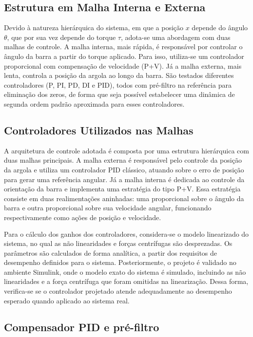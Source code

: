 \documentclass[a4paper, 12pt]{article}
\begin{document}
\subsection{Estrutura em Malha Interna e Externa}
Devido à natureza hierárquica do sistema, em que a posição \( x \) depende do ângulo \( \theta \), que por sua vez depende do torque \( \tau \), adota-se uma abordagem com duas malhas de controle. A malha interna, mais rápida, é responsável por controlar o ângulo da barra a partir do torque aplicado. Para isso, utiliza-se um controlador proporcional com compensação de velocidade (P+V). Já a malha externa, mais lenta, controla a posição da argola ao longo da barra. São testados diferentes controladores (P, PI, PD, DI e PID), todos com pré-filtro na referência para eliminação dos zeros, de forma que seja possível estabelecer uma dinâmica de segunda ordem padrão aproximada para esses controladores.

\subsection{Controladores Utilizados nas Malhas}

A arquitetura de controle adotada é composta por uma estrutura hierárquica com duas malhas principais. A malha externa é responsável pelo controle da posição da argola e utiliza um controlador PID clássico, atuando sobre o erro de posição para gerar uma referência angular. Já a malha interna é dedicada ao controle da orientação da barra e implementa uma estratégia do tipo P+V. Essa estratégia consiste em duas realimentações aninhadas: uma proporcional sobre o ângulo da barra e outra proporcional sobre sua velocidade angular, funcionando respectivamente como ações de posição e velocidade.

Para o cálculo dos ganhos dos controladores, considera-se o modelo linearizado do sistema, no qual as não linearidades e forças centrífugas são desprezadas. Os parâmetros são calculados de forma analítica, a partir dos requisitos de desempenho definidos para o sistema. Posteriormente, o projeto é validado no ambiente Simulink, onde o modelo exato do sistema é simulado, incluindo as não linearidades e a força centrífuga que foram omitidas na linearização. Dessa forma, verifica-se se o controlador projetado atende adequadamente ao desempenho esperado quando aplicado ao sistema real.

\subsection{Compensador PID e pré-filtro}
\end{document}
